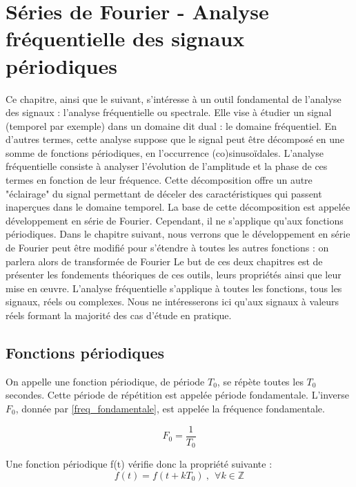 \chapter{Séries de Fourier - Analyse fréquentielle des signaux périodiques}

	Ce chapitre, ainsi que le suivant, s'intéresse à un outil fondamental de l'analyse des signaux : l'analyse fréquentielle ou spectrale. Elle vise à étudier un signal (temporel par exemple) dans un domaine dit dual : le domaine fréquentiel. En d'autres termes, cette analyse suppose que le signal peut être décomposé en une somme de fonctions périodiques, en l'occurrence (co)sinusoïdales. L'analyse fréquentielle consiste à analyser l'évolution de l'amplitude et la phase de ces termes en fonction de leur fréquence. Cette décomposition offre un autre "éclairage" du signal permettant de déceler des caractéristiques qui passent inaperçues dans le domaine temporel. La base de cette décomposition est appelée développement en série de Fourier. Cependant, il ne s'applique qu'aux fonctions périodiques. Dans le chapitre suivant, nous verrons que le développement en série de Fourier peut être modifié pour s'étendre à toutes les autres fonctions : on parlera alors de transformée de Fourier
	Le but de ces deux chapitres est de présenter les fondements théoriques de ces outils, leurs propriétés ainsi que leur mise en œuvre. L'analyse fréquentielle s'applique à toutes les fonctions, tous les signaux, réels ou complexes. Nous ne intéresserons ici qu'aux signaux à valeurs réels formant la majorité des cas d'étude en pratique.
	
	\section{Fonctions périodiques}
	On appelle une fonction périodique, de période $T_{0}$, se répète toutes les $T_{0}$ secondes. Cette période de répétition est appelée période fondamentale. L'inverse $F_{0}$, donnée par \ref{freq_fondamentale}, est appelée la fréquence fondamentale.
	
	\begin{equation}\label{freq_fondamentale}
	F_{0}=\frac{1}{T_{0}}
	\end{equation}
	
	Une fonction périodique f(t) vérifie donc la propriété suivante :
	\begin{equation}\label{Fonction_periodique}
	f(t)=f(t+kT_{0})~,~~\forall k\in \mathbb{Z}
	\end{equation}
	
